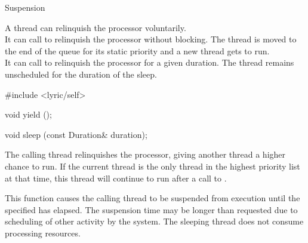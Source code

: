 

\begin{manpage}{Suspension}
\let\savedmanlayout=\manlayout
\renewcommand{\manlayout}{vcompact}

A thread can relinquish the processor voluntarily.
\\
It can call  to relinquish the processor without blocking.
The thread is moved to the end of the queue for its static priority and a new thread gets to run.
\\
It can call  to relinquish the processor for a given duration.
The thread remains unscheduled for the duration of the sleep.

\begin{mansynopsis}
#include <lyric/self>

void yield ();

void sleep (const Duration& duration);
\end{mansynopsis}

\begin{mandescription}
    The calling thread relinquishes the processor, giving another thread a higher chance to run.
    If the current thread is the only thread in the highest priority list at that time, this thread will continue to run after a call to .

    This function causes the calling thread to be suspended from execution until the specified  has elapsed.
    The suspension time may be longer than requested due to scheduling of other activity by the system.
    The sleeping thread does not consume processing resources.
\end{mandescription}

\renewcommand{\manlayout}{\savedmanlayout}
\end{manpage}


